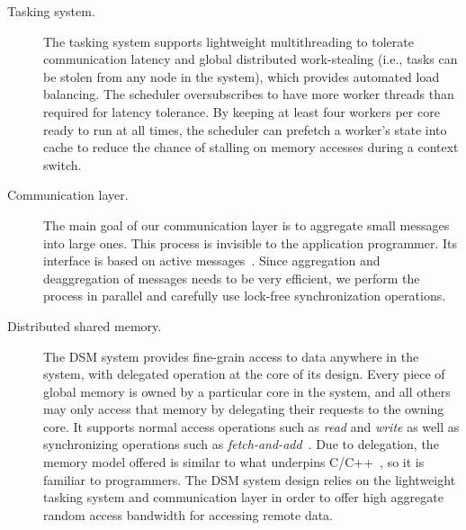 \begin{description}

\item [Tasking system.] The tasking system supports lightweight multithreading
to tolerate communication latency and global distributed work-stealing (i.e.,
tasks can be stolen from any node in the system), which provides automated
load balancing. The scheduler oversubscribes to have more worker threads than
required for latency tolerance. By keeping at least four workers per 
core ready to run at all times, the scheduler can prefetch a worker's state
into cache to reduce the chance of stalling on memory accesses during a
context switch.

\item[Communication layer.] The main goal of our communication layer is to
aggregate small messages into large ones.  This process is invisible to the application
programmer. Its interface is based on active messages~\cite{vonEicken92}.
Since aggregation and deaggregation of messages needs to be very efficient, we perform the process in parallel and carefully use lock-free synchronization
operations.

\item[Distributed shared memory.] The DSM system provides fine-grain access to
data anywhere in the system, with delegated operation at the core of its design.
Every piece of global memory is owned by a particular core in the system, and all others may only access that memory by delegating their requests to the owning core.
It supports normal access operations such as
\emph{read\/} and \emph{write\/} as well as synchronizing operations such as
\emph{fetch-and-add\/}~\cite{fetchandadd}. Due to delegation, the memory model offered is similar to what underpins
C/C++~\cite{N2480,N2800}, so it is familiar to programmers. The DSM system
design relies on the lightweight tasking system and communication layer in
order to offer high aggregate random access bandwidth for accessing remote
data.

\end{description}

